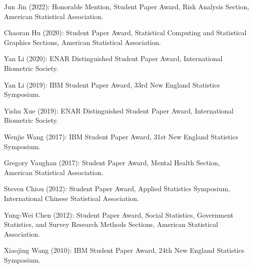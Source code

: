 \documentclass[Statistics]{vita}
\begin{document}
\begin{vita}
\begin{TeachingAccomplishments}
\begin{StudentAwards}
    \item Jun Jin (2022): Honorable Mention, Student Paper Award, Risk Analysis Section, American Statistical Association.
    \item Chaoran Hu (2020): Student Paper Award, Statistical Computing and Statistical Graphics Sections, American Statistical Association.
    \item Yan Li (2020): ENAR Distinguished Student Paper Award, International Biometric Society.
    \item Yan Li (2019): IBM Student Paper Award, 33rd New England Statistics Symposium.
    \item Yishu Xue (2019): ENAR Distinguished Student Paper Award, International Biometric Society.
    \item Wenjie Wang (2017): IBM Student Paper Award, 31st New England Statistics Symposium.
    \item Gregory Vaughan (2017): Student Paper Award, Mental Health Section, American Statistical Association.
    \item Steven Chiou (2012): Student Paper Award, Applied Statistics Symposium, International Chinese Statistical Association.
    \item Yung-Wei Chen (2012): Student Paper Award,  Social Statistics, Government Statistics, and Survey Research Methods Sections,  American Statistical Association.
    \item Xiaojing Wang (2010): IBM Student Paper Award, 24th New England Statistics Symposium.
    \end{StudentAwards}
    \begin{TeachingHighlights}

\end{TeachingHighlights}
\end{TeachingAccomplishments}
\end{vita}
\end{document}
